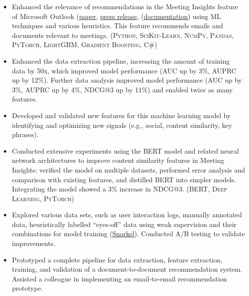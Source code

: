 \documentclass{article}
\newcommand{\mytexttilde}{\raisebox{0.5ex}{\texttildelow}}
\begin{document}
\begin{itemize}
  \begin{itemize}

  \item Enhanced the relevance of recommendations in the Meeting Insights feature of Microsoft Outlook (\href{https://www.microsoft.com/en-us/research/publication/calendar-aware-proactive-email-recommendation/}{paper}, \href{https://www.microsoft.com/en-us/research/blog/the-story-of-an-office-ai-feature-how-ai-can-promote-efficient-meeting-preparation/}{press release}, (\href{https://support.microsoft.com/en-gb/office/use-intelligent-technology-in-outlook-on-the-web-and-outlook-com-24b30683-8340-4b69-b8ac-4193ec528a70}{documentation}) using ML techniques and various heuristics. This feature recommends emails and documents relevant to meetings. (\textsc{Python}, \textsc{SciKit-Learn}, \textsc{NumPy}, \textsc{Pandas}, \textsc{PyTorch}, \textsc{LightGBM}, \textsc{Gradient Boosting}, \textsc{C\#})

  \item Enhanced the data extraction pipeline, increasing the amount of training data by \mytexttilde 50x, which improved model performance (AUC up by 3\%, AUPRC up by 12\%). Further data analysis improved model performance (AUC up by 3\%, AUPRC up by 4\%, NDCG@3 up by 11\%) and enabled twice as many features.

  \item Developed and validated new features for this machine learning model by identifying and optimizing new signals (e.g., social, content similarity, key phrases).

  \item Conducted extensive experiments using the \textsc{BERT} model and related neural network architectures to improve content similarity features in Meeting Insights: verified the model on multiple datasets, performed error analysis and comparison with existing features, and distilled BERT into simpler models. Integrating the model showed a 3\% increase in NDCG@3. (\textsc{BERT}, \textsc{Deep Learning}, \textsc{PyTorch})

  \item Explored various data sets, such as user interaction logs, manually annotated data, heuristically labelled ``eyes-off'' data using weak supervision and their combinations for model training (\href{https://snorkel.ai/}{Snorkel}). Conducted A/B testing to validate improvements.

  \item Prototyped a complete pipeline for data extraction, feature extraction, training, and validation of a document-to-document recommendation system. Assisted a colleague in implementing an email-to-email recommendation prototype.


\end{itemize}
\end{itemize}
\end{document}
